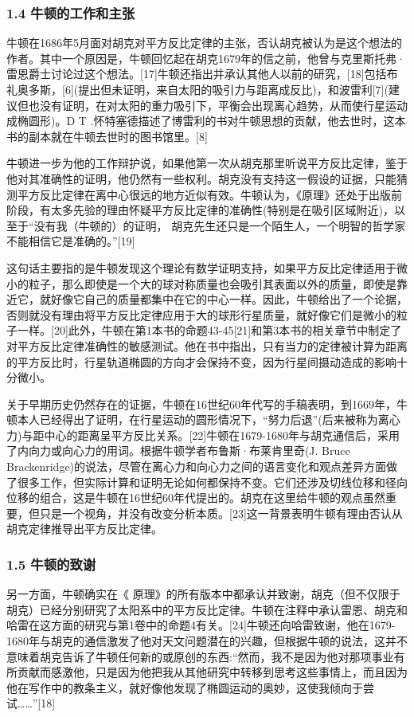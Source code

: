 \subsubsection{1.4 牛顿的工作和主张}

牛顿在1686年5月面对胡克对平方反比定律的主张，否认胡克被认为是这个想法的作者。其中一个原因是，牛顿回忆起在胡克1679年的信之前，他曾与克里斯托弗·雷恩爵士讨论过这个想法。[17]牛顿还指出并承认其他人以前的研究，[18]包括布礼奥多斯，[6](提出但未证明，来自太阳的吸引力与距离成反比)，和波雷利[7](建议但也没有证明，在对太阳的重力吸引下，平衡会出现离心趋势，从而使行星运动成椭圆形)。D T .怀特塞德描述了博雷利的书对牛顿思想的贡献，他去世时，这本书的副本就在牛顿去世时的图书馆里。[8]

牛顿进一步为他的工作辩护说，如果他第一次从胡克那里听说平方反比定律，鉴于他对其准确性的证明，他仍然有一些权利。胡克没有支持这一假设的证据，只能猜测平方反比定律在离中心很远的地方近似有效。牛顿认为，《原理》还处于出版前阶段，有太多先验的理由怀疑平方反比定律的准确性(特别是在吸引区域附近)，以至于“没有我（牛顿的）的证明， 胡克先生还只是一个陌生人，一个明智的哲学家不能相信它是准确的。”[19]

这句话主要指的是牛顿发现这个理论有数学证明支持，如果平方反比定律适用于微小的粒子，那么即使是一个大的球对称质量也会吸引其表面以外的质量，即使是靠近它，就好像它自己的质量都集中在它的中心一样。因此，牛顿给出了一个论据，否则就没有理由将平方反比定律应用于大的球形行星质量，就好像它们是微小的粒子一样。[20]此外，牛顿在第1本书的命题43-45[21]和第3本书的相关章节中制定了对平方反比定律准确性的敏感测试。他在书中指出，只有当力的定律被计算为距离的平方反比时，行星轨道椭圆的方向才会保持不变，因为行星间摄动造成的影响十分微小。

关于早期历史仍然存在的证据，牛顿在16世纪60年代写的手稿表明，到1669年，牛顿本人已经得出了证明，在行星运动的圆形情况下，“努力后退”(后来被称为离心力)与距中心的距离呈平方反比关系。[22]牛顿在1679-1680年与胡克通信后，采用了内向力或向心力的用词。根据牛顿学者布鲁斯·布莱肯里奇(J. Bruce Brackenridge)的说法，尽管在离心力和向心力之间的语言变化和观点差异方面做了很多工作，但实际计算和证明无论如何都保持不变。它们还涉及切线位移和径向位移的组合，这是牛顿在16世纪60年代提出的。胡克在这里给牛顿的观点虽然重要，但只是一个视角，并没有改变分析本质。[23]这一背景表明牛顿有理由否认从胡克定律推导出平方反比定律。

\subsubsection{1.5 牛顿的致谢}

另一方面，牛顿确实在《 原理》的所有版本中都承认并致谢，胡克（但不仅限于胡克）已经分别研究了太阳系中的平方反比定律。牛顿在注释中承认雷恩、胡克和哈雷在这方面的研究与第1卷中的命题4有关。[24]牛顿还向哈雷致谢，他在1679-1680年与胡克的通信激发了他对天文问题潜在的兴趣，但根据牛顿的说法，这并不意味着胡克告诉了牛顿任何新的或原创的东西:“然而，我不是因为他对那项事业有所贡献而感激他，只是因为他把我从其他研究中转移到思考这些事情上，而且因为他在写作中的教条主义，就好像他发现了椭圆运动的奥妙，这使我倾向于尝试……”[18]

